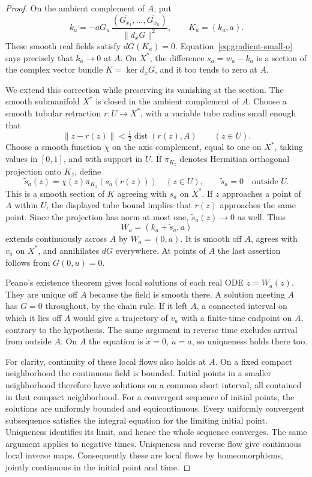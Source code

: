 \begin{proof}
On the ambient complement of $A$, put
\[
 k_a=-aG_u\,
       \frac{(\overline{G_{x_1}},\ldots,\overline{G_{x_n}})}
            {\|d_xG\|^2},\qquad K_a=(k_a,a).
\]
These smooth real fields satisfy $dG(K_a)=0$.
Equation~\eqref{eq:gradient-small-o} says precisely that $k_a\to0$ at
$A$.  On $X^*$, the difference $s_a=w_a-k_a$ is a section of the
complex vector bundle $K=\ker d_xG$, and it too tends to zero at $A$.

We extend this correction while preserving its vanishing at the
section.  The smooth submanifold $X^*$ is closed in the ambient
complement of $A$.  Choose a smooth tubular retraction $r:U\to X^*$,
with a variable tube radius small enough that
\[
 \|z-r(z)\|<\tfrac12\operatorname{dist}(r(z),A)
 \qquad(z\in U).
\]
Choose a smooth function $\chi$ on the axis complement, equal to one
on $X^*$, taking values in $[0,1]$, and with support in $U$.  If
$\pi_{K_z}$ denotes Hermitian orthogonal projection onto $K_z$, define
\[
 \widetilde s_a(z)=\chi(z)\pi_{K_z}(s_a(r(z)))\quad(z\in U),
 \qquad \widetilde s_a=0\quad\text{outside }U.
\]
This is a smooth section of $K$ agreeing with $s_a$ on $X^*$.
If $z$ approaches a point of $A$ within $U$, the displayed tube bound
implies that $r(z)$ approaches the same point.  Since the projection
has norm at most one, $\widetilde s_a(z)\to0$ as well.  Thus
\[
 W_a=(k_a+\widetilde s_a,a)
\]
extends continuously across $A$ by $W_a=(0,a)$.  It is smooth off
$A$, agrees with $v_a$ on $X^*$, and annihilates $dG$ everywhere.
At points of $A$ the last assertion follows from $G(0,u)=0$.

Peano's existence theorem gives local solutions of each real ODE
$\dot z=W_a(z)$.  They are unique off $A$ because the field is
smooth there.  A solution meeting $A$ has $G=0$ throughout, by the
chain rule.  If it left $A$, a connected interval on which it lies
off $A$ would give a trajectory of $v_a$ with a finite-time endpoint
on $A$, contrary to the hypothesis.  The same argument in reverse
time excludes arrival from outside $A$.  On $A$ the equation is
$\dot x=0$, $\dot u=a$, so uniqueness holds there too.

For clarity, continuity of these local flows also holds at $A$.
On a fixed compact neighborhood the continuous field is bounded.
Initial points in a smaller neighborhood therefore have solutions on
a common short interval, all contained in that compact neighborhood.
For a convergent sequence of initial points, the solutions are
uniformly bounded and equicontinuous.  Every uniformly convergent
subsequence satisfies the integral equation for the limiting initial
point.  Uniqueness identifies its limit, and hence the whole sequence
converges.  The same argument applies to negative times.  Uniqueness
and reverse flow give continuous local inverse maps.  Consequently
these are local flows by homeomorphisms, jointly continuous in the
initial point and time.


\end{proof}
